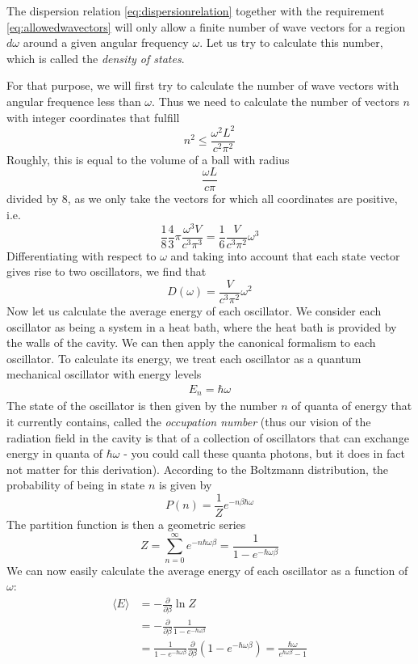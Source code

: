 \documentclass[a4paper, draft]{article}
\theoremstyle{own}
\theoremstyle{remark}
\begin{document}
The dispersion relation  \eqref{eq:dispersionrelation} together with the requirement \eqref{eq:allowedwavectors} will only allow a finite number of wave vectors for a region $d\omega$ around a given angular frequency $\omega$. Let us try to calculate this number, which is called the {\em density of states}.

For that purpose, we will first try to calculate the number of wave vectors with angular frequence less than $\omega$. Thus we need to calculate the number of vectors $n$ with integer coordinates that fulfill
$$
n^2 \leq \frac{\omega^2 L^2}{c^2 \pi^2}
$$
Roughly, this is equal to the volume of a ball with radius
$$
\frac{\omega L}{c \pi}
$$
divided by $8$, as we only take the vectors for which all coordinates are positive, i.e. 
$$
\frac{1}{8} \frac{4}{3} \pi \frac{\omega^3 V}{c^3 \pi^3} = \frac{1}{6} \frac{V}{c^3 \pi^2}\omega^3
$$
Differentiating with respect to $\omega$ and taking into account that each state vector gives rise to two oscillators, we find that
$$
D(\omega) = \frac{V}{c^3 \pi^2}\omega^2 
$$
Now let us calculate the average energy of each oscillator. We consider each oscillator as being a system in a heat bath, where the heat bath is provided by the walls of the cavity. We can then apply the canonical formalism to each oscillator. To calculate its energy, we treat each oscillator as a quantum mechanical oscillator with energy levels
\begin{align}\label{eq:quantizationpostulate}
E_n = \hbar \omega 
\end{align}
The state of the oscillator is then given by the number $n$ of quanta of energy that it currently contains, called the {\em occupation number} (thus our vision of the radiation field in the cavity is that of a collection of oscillators that can exchange energy in quanta of $\hbar \omega$ - you could call these quanta photons, but it does in fact not matter for this derivation). According to the Boltzmann distribution, the probability of being in state $n$ is given by
$$
P(n) = \frac{1}{Z} e^{-n\beta \hbar \omega}
$$
The partition function is then a geometric series
$$
Z = \sum_{n=0}^\infty e^{-n\hbar \omega \beta} = \frac{1}{1 - e^{-\hbar \omega \beta}}
$$
We can now easily calculate the average energy of each oscillator as a function of $\omega$:
\begin{align*}
\langle E \rangle &= - \frac{\partial}{\partial \beta} \ln Z \\
&= - \frac{\partial}{\partial \beta}  \frac{1}{1 - e^{-\hbar \omega \beta}} \\
&= \frac{1}{1 - e^{-\hbar \omega \beta}} \frac{\partial}{\partial \beta}
(1 - e^{-\hbar \omega \beta}) = \frac{\hbar \omega}{e^{\hbar \omega \beta} - 1}
\end{align*}
\end{document}
